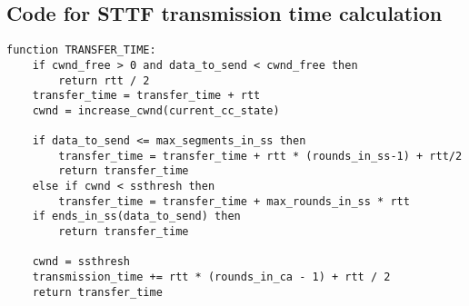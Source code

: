 \subsection{Code for \acs{STTF} transmission time calculation}
\begin{lstlisting}[frame=single, caption={\ac{STTF} pseudo code, source: \cite{lowlatschedulers}},label=code::sttf]
function TRANSFER_TIME:
    if cwnd_free > 0 and data_to_send < cwnd_free then
        return rtt / 2
    transfer_time = transfer_time + rtt
    cwnd = increase_cwnd(current_cc_state)

    if data_to_send <= max_segments_in_ss then
        transfer_time = transfer_time + rtt * (rounds_in_ss-1) + rtt/2
        return transfer_time
    else if cwnd < ssthresh then
        transfer_time = transfer_time + max_rounds_in_ss * rtt
    if ends_in_ss(data_to_send) then
        return transfer_time

    cwnd = ssthresh
    transmission_time += rtt * (rounds_in_ca - 1) + rtt / 2
    return transfer_time
\end{lstlisting}